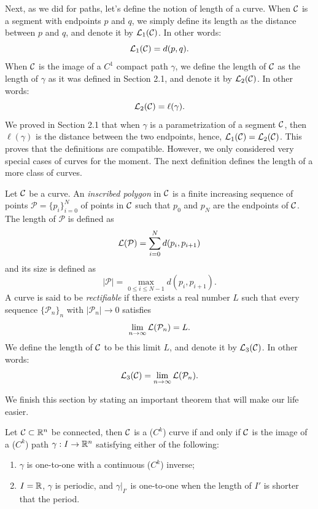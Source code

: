 Next, as we did for paths, let's define the notion of length of a curve. When $\mathcal{C}$ is a segment with endpoints $p$ and $q$, we simply define its length as the distance between $p$ and $q$, and denote it by $\mathcal{L}_1(\mathcal{C})$. In other words:
$$\mathcal{L}_1(\mathcal{C}) = d(p,q).$$
When $\mathcal{C}$ is the image of a $C^1$ compact path $\gamma$, we define the length of $\mathcal{C}$ as the length of $\gamma$ as it was defined in Section 2.1, and denote it by $\mathcal{L}_2(\mathcal{C})$. In other words:
$$\mathcal{L}_2(\mathcal{C}) = \ell(\gamma).$$
We proved in Section 2.1 that when $\gamma$ is a parametrization of a segment $\mathcal{C}$, then $\ell(\gamma)$ is the distance between the two endpoints, hence, $\mathcal{L}_1(\mathcal{C}) = \mathcal{L}_2(\mathcal{C})$. This proves that the definitions are compatible. However, we only considered very special cases of curves for the moment. The next definition defines the length of a more class of curves.

\begin{definition}
    Let $\mathcal{C}$ be a curve. An \textit{inscribed polygon} in $\mathcal{C}$ is a finite increasing sequence of points $\mathcal{P} = \{p_i\}_{i=0}^N$ of points in $\mathcal{C}$ such that $p_0$ and $p_N$ are the endpoints of $\mathcal{C}$. The length of $\mathcal{P}$ is defined as
    $$\mathcal{L}(\mathcal{P}) = \sum_{i=0}^Nd(p_i, p_{i+1})$$
    and its size is defined as
    $$|\mathcal{P}| = \max_{0\leq i \leq N-1}d(p_i, p_{i+1}).$$
    A curve is said to be \textit{rectifiable} if there exists a real number $L$ such that every sequence $\{\mathcal{P}_n\}_n$ with $|\mathcal{P}_n| \to 0$ satisfies
    $$\lim_{n\rightarrow \infty}\mathcal{L}(\mathcal{P}_n) = L.$$
    We define the length of $\mathcal{C}$ to be this limit $L$, and denote it by $\mathcal{L}_3(\mathcal{C})$. In other words:
    $$\mathcal{L}_3(\mathcal{C}) = \lim_{n\rightarrow \infty}\mathcal{L}(\mathcal{P}_n).$$
\end{definition}

We finish this section by stating an important theorem that will make our life easier.

\begin{theorem}
    Let $\mathcal{C}\subset \mathbb{R}^n$ be connected, then $\mathcal{C}$ is a ($C^k$) curve if and only if $\mathcal{C}$ is the image of a ($C^k$) path $\gamma : I \to \mathbb{R}^n$ satisfying either of the following:
    \begin{enumerate}
        \item $\gamma$ is one-to-one with a continuous ($C^k$) inverse;
        \item $I = \mathbb{R}$, $\gamma$ is periodic, and $\gamma|_{I'}$ is one-to-one when the length of $I'$ is shorter that the period.
    \end{enumerate}
\end{theorem}

